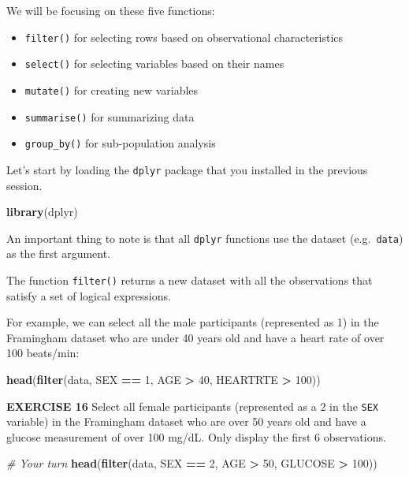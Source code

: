 \documentclass[
]{article}
\newenvironment{Shaded}{\begin{snugshade}}{\end{snugshade}}
\newcommand{\CommentTok}[1]{\textcolor[rgb]{0.56,0.35,0.01}{\textit{#1}}}
\newcommand{\DecValTok}[1]{\textcolor[rgb]{0.00,0.00,0.81}{#1}}
\newcommand{\KeywordTok}[1]{\textcolor[rgb]{0.13,0.29,0.53}{\textbf{#1}}}
\newcommand{\NormalTok}[1]{#1}
\newcommand{\OperatorTok}[1]{\textcolor[rgb]{0.81,0.36,0.00}{\textbf{#1}}}
\newcommand{\StringTok}[1]{\textcolor[rgb]{0.31,0.60,0.02}{#1}}
\providecommand{\tightlist}{%
  \setlength{\itemsep}{0pt}\setlength{\parskip}{0pt}}
\begin{document}
We will be focusing on these five functions:

\begin{itemize}
\tightlist
\item
  \texttt{filter()} for selecting rows based on observational
  characteristics
\item
  \texttt{select()} for selecting variables based on their names
\item
  \texttt{mutate()} for creating new variables
\item
  \texttt{summarise()} for summarizing data
\item
  \texttt{group\_by()} for sub-population analysis
\end{itemize}

Let's start by loading the \texttt{dplyr} package that you installed in
the previous session.

\begin{Shaded}
\begin{Highlighting}[]
\KeywordTok{library}\NormalTok{(dplyr)}
\end{Highlighting}
\end{Shaded}

An important thing to note is that all \texttt{dplyr} functions use the
dataset (e.g.~\texttt{data}) as the first argument.

The function \texttt{filter()} returns a new dataset with all the
observations that satisfy a set of logical expressions.

For example, we can select all the male participants (represented as 1)
in the Framingham dataset who are under 40 years old and have a heart
rate of over 100 beats/min:

\begin{Shaded}
\begin{Highlighting}[]
\KeywordTok{head}\NormalTok{(}\KeywordTok{filter}\NormalTok{(data, SEX }\OperatorTok{==}\StringTok{ }\DecValTok{1}\NormalTok{, AGE }\OperatorTok{>}\StringTok{ }\DecValTok{40}\NormalTok{, HEARTRTE }\OperatorTok{>}\StringTok{ }\DecValTok{100}\NormalTok{))}
\end{Highlighting}
\end{Shaded}

\textbf{EXERCISE 16} Select all female participants (represented as a 2
in the \texttt{SEX} variable) in the Framingham dataset who are over 50
years old and have a glucose measurement of over 100 mg/dL. Only display
the first 6 observations.

\begin{Shaded}
\begin{Highlighting}[]
\CommentTok{# Your turn}
\KeywordTok{head}\NormalTok{(}\KeywordTok{filter}\NormalTok{(data, SEX }\OperatorTok{==}\StringTok{ }\DecValTok{2}\NormalTok{, AGE }\OperatorTok{>}\StringTok{ }\DecValTok{50}\NormalTok{, GLUCOSE }\OperatorTok{>}\StringTok{ }\DecValTok{100}\NormalTok{))}
\end{Highlighting}
\end{Shaded}
\end{document}
